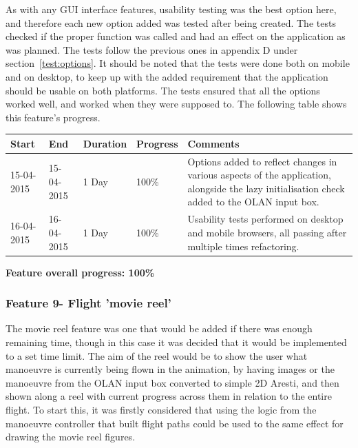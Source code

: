 As with any GUI interface features, usability testing was the best option here, and therefore each new option added was tested after being created. The tests checked if the proper function was called and had an effect on the application as was planned. The tests follow the previous ones in appendix D under section~\ref{test:options}. It should be noted that the tests were done both on mobile and on desktop, to keep up with the added requirement that the application should be usable on both platforms. The tests ensured that all the options worked well, and worked when they were supposed to. The following table shows this feature's progress.

\begin{table}[h]
\begin{tabular}{|l|l|l|l|p{7cm}|}
\hline
\textbf{Start} & \textbf{End} & \textbf{Duration} & \textbf{Progress} & \textbf{Comments}                                                                                                     \\ \hline
15-04-2015     & 15-04-2015   & 1 Day            & 100\%             &  Options added to reflect changes in various aspects of the application, alongside the lazy initialisation check added to the OLAN input box.\\ \hline
16-04-2015     & 16-04-2015   & 1 Day            & 100\%             &  Usability tests performed on desktop and mobile browsers, all passing after multiple times refactoring. \\ \hline
\end{tabular}
\end{table}

\textbf{Feature overall progress: 100\%}

\subsubsection{Feature 9- Flight 'movie reel'}
The movie reel feature was one that would be added if there was enough remaining time, though in this case it was decided that it would be implemented to a set time limit. The aim of the reel would be to show the user what manoeuvre is currently being flown in the animation, by having images or the manoeuvre from the OLAN input box converted to simple 2D Aresti, and then shown along a reel with current progress across them in relation to the entire flight. To start this, it was firstly considered that using the logic from the manoeuvre controller that built flight paths could be used to the same effect for drawing the movie reel figures. 

